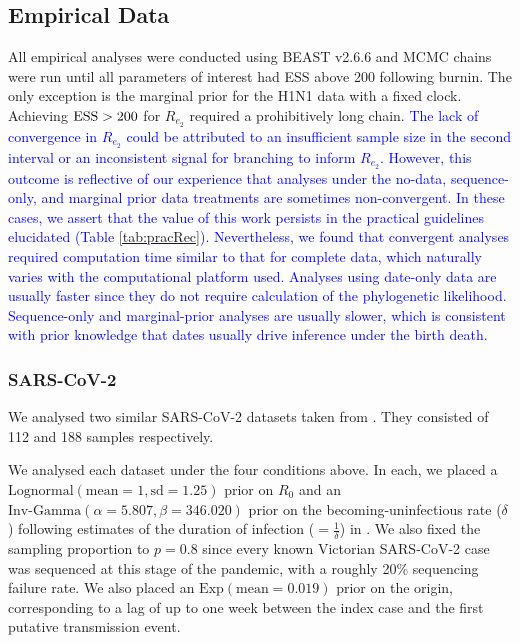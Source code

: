 \documentclass{article}
\begin{document}
\subsection*{Empirical Data}
All empirical analyses were conducted using BEAST v2.6.6 \citep{bouckaert_beast_2019} and MCMC chains were run until all parameters of interest had ESS above 200 following burnin. The only exception is the marginal prior for the H1N1 data with a fixed clock. Achieving $\textnormal{ESS} > 200$ for $R_{e_2}$ required a prohibitively long chain. \textcolor{blue}{The lack of convergence in $R_{e_2}$ could be attributed to an insufficient sample size in the second interval or an inconsistent signal for branching to inform $R_{e_2}$. However, this outcome is reflective of our experience that analyses under the no-data, sequence-only, and marginal prior data treatments are sometimes non-convergent. In these cases, we assert that the value of this work persists in the practical guidelines elucidated (Table \ref{tab:pracRec}). Nevertheless, we found that convergent analyses required computation time similar to that for complete data, which naturally varies with the computational platform used. Analyses using date-only data are usually faster since they do not require calculation of the phylogenetic likelihood. Sequence-only and marginal-prior analyses are usually slower, which is consistent with prior knowledge that dates usually drive inference under the birth death.}

\subsubsection*{SARS-CoV-2}
We analysed two similar SARS-CoV-2 datasets taken from \citet{lane2021genomics}. They consisted of 112 and 188 samples respectively. 

We analysed  each dataset under the four conditions above. In each, we placed a $\textrm{Lognormal}(\textrm{mean}=1, \textrm{sd}=1.25)$ prior on $R_0$ and an $\textrm{Inv-Gamma}(\alpha=5.807, \beta=346.020)$ prior on the becoming-uninfectious rate ($\delta$) following estimates of the duration of infection ($=\frac{1}{\delta}$) in \cite{Lauer2020The}. We also fixed the sampling proportion to $p=0.8$ since every known Victorian SARS-CoV-2 case was sequenced at this stage of the pandemic, with a roughly 20\% sequencing failure rate. We also placed an $\textrm{Exp}(\textrm{mean}=0.019)$ prior on the origin, corresponding to a lag of up to one week  between the index case and the first putative transmission event.
\end{document}
